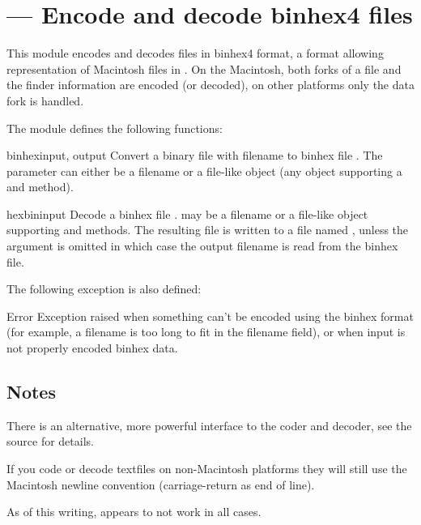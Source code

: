 \section{ ---
         Encode and decode binhex4 files}



This module encodes and decodes files in binhex4 format, a format
allowing representation of Macintosh files in \ASCII.  On the Macintosh,
both forks of a file and the finder information are encoded (or
decoded), on other platforms only the data fork is handled.

The  module defines the following functions:

\begin{funcdesc}{binhex}{input, output}
Convert a binary file with filename  to binhex file
. The  parameter can either be a filename or a
file-like object (any object supporting a  and
 method).
\end{funcdesc}

\begin{funcdesc}{hexbin}{input}
Decode a binhex file .  may be a filename or a
file-like object supporting  and  methods.
The resulting file is written to a file named , unless the
argument is omitted in which case the output filename is read from the
binhex file.
\end{funcdesc}

The following exception is also defined:

\begin{excdesc}{Error}
Exception raised when something can't be encoded using the binhex
format (for example, a filename is too long to fit in the filename
field), or when input is not properly encoded binhex data.
\end{excdesc}


\begin{seealso}
\end{seealso}


\subsection{Notes \label{binhex-notes}}

There is an alternative, more powerful interface to the coder and
decoder, see the source for details.

If you code or decode textfiles on non-Macintosh platforms they will
still use the Macintosh newline convention (carriage-return as end of
line).

As of this writing,  appears to not work in all
cases.
